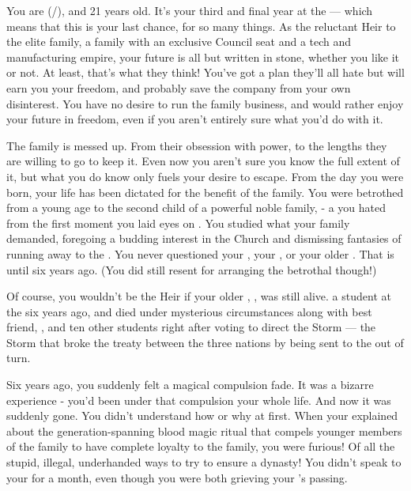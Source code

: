 \documentclass[char]{GL2020}
\begin{document}
\name{\cHeir{}}

You are \cHeir{\full} (\cHeir{\they}/\cHeir{\them}), and 21 years old. It's your third and final year at the \pSchool{} — which means that this is your last chance, for so many things. As the reluctant Heir to the elite \cHeir{\formal} family, a family with an exclusive Council seat and a tech and manufacturing empire, your future is all but written in stone, whether you like it or not. At least, that's what they think! You've got a plan they'll all hate but will earn you your freedom, and probably save the company from your own disinterest. You have no desire to run the family business, and would rather enjoy your future in freedom, even if you aren't entirely sure what you'd do with it.

The \cHeir{\formal} family is messed up. From their obsession with power, to the lengths they are willing to go to keep it. Even now you aren’t sure you know the full extent of it, but what you do know only fuels your desire to escape. From the day you were born, your life has been dictated for the benefit of the family. You were betrothed from a young age to the second child of a powerful \pFarm{} noble family, \cChupStudent{\full} - a \cChupStudent{\kid} you hated from the first moment you laid eyes on \cChupStudent{\them}. You studied what your family demanded, foregoing a budding interest in the Church and dismissing fantasies of running away to the \pShip{}. You never questioned your \cFaledonParent{\parent} \cFaledonParent{}, your \cDiplomat{\auncle} \cDiplomat{\auncle}, or your older \cHeirSibling{\sibling} \cHeirSibling{}. That is until six years ago. (You did still resent \cDiplomat{} for arranging the betrothal though!)

Of course, you wouldn't be the \cHeir{\formal} Heir if your older \cHeirSibling{\sibling}, \cHeirSibling{\full}, was still alive. \cHeirSibling{\They} \cHeirSibling{\were} a student at the \pSchool{} six years ago, and died under mysterious circumstances along with \cHeirSibling{\their} best friend, \cKidScientist{\full}, and ten other students right after voting to direct the Storm — the Storm that broke the treaty between the three nations by being sent to the \pShip{} out of turn. 

Six years ago, you suddenly felt a magical compulsion fade. It was a bizarre experience - you’d been under that compulsion your whole life. And now it was suddenly gone. You didn’t understand how or why at first. When your \cFaledonParent{\parent} explained about the generation-spanning blood magic ritual that compels younger members of the \cHeir{\formal} family to have complete loyalty to the family, you were furious! Of all the stupid, illegal, underhanded ways to try to ensure a dynasty! You didn’t speak to your  for a month, even though you were both grieving your \cHeirSibling{\sibling}’s passing.
\end{document}
